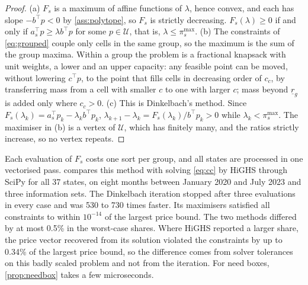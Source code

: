 \documentclass[preprint,12pt,number]{elsarticle}%
\theoremstyle{definition}
\theoremstyle{remark}
\newcommand{\U}{\mathcal{U}}
\newcommand{\pimax}{\pi^{\max}}
\begin{document}
\begin{proof}
(a) $F_s$ is a maximum of affine functions of $\lambda$, hence convex, and each has slope $-b^{\top}p<0$ by \cref{ass:polytope}, so $F_s$ is strictly decreasing. $F_s(\lambda)\ge0$ if and only if $a_s^{\top}p\ge\lambda b^{\top}p$ for some $p\in\U$, that is, $\lambda\le\pimax_s$. (b) The constraints of \eqref{eq:grouped} couple only cells in the same group, so the maximum is the sum of the group maxima. Within a group the problem is a fractional knapsack with unit weights, a lower and an upper capacity: any feasible point can be moved, without lowering $c^{\top}p$, to the point that fills cells in decreasing order of $c_c$, by transferring mass from a cell with smaller $c$ to one with larger $c$; mass beyond $\underline r_g$ is added only where $c_c>0$. (c) This is Dinkelbach's method. Since $F_s(\lambda_k)=a_s^{\top}p_k-\lambda_kb^{\top}p_k$, $\lambda_{k+1}-\lambda_k=F_s(\lambda_k)/b^{\top}p_k>0$ while $\lambda_k<\pimax_s$. The maximiser in (b) is a vertex of $\U$, which has finitely many, and the ratios strictly increase, so no vertex repeats.
\end{proof}

Each evaluation of $F_s$ costs one sort per group, and all states are processed in one vectorised pass.  compares this method with solving \eqref{eq:cc} by HiGHS through SciPy for all 37 states, on eight months between January 2020 and July 2023 and three information sets. The Dinkelbach iteration stopped after three evaluations in every case and was 530 to 730 times faster. Its maximisers satisfied all constraints to within $10^{-14}$ of the largest price bound. The two methods differed by at most 0.5\% in the worst-case shares. Where HiGHS reported a larger share, the price vector recovered from its solution violated the constraints by up to 0.34\% of the largest price bound, so the difference comes from solver tolerances on this badly scaled problem and not from the iteration. For need boxes, \cref{prop:needbox} takes a few microseconds.
\end{document}
